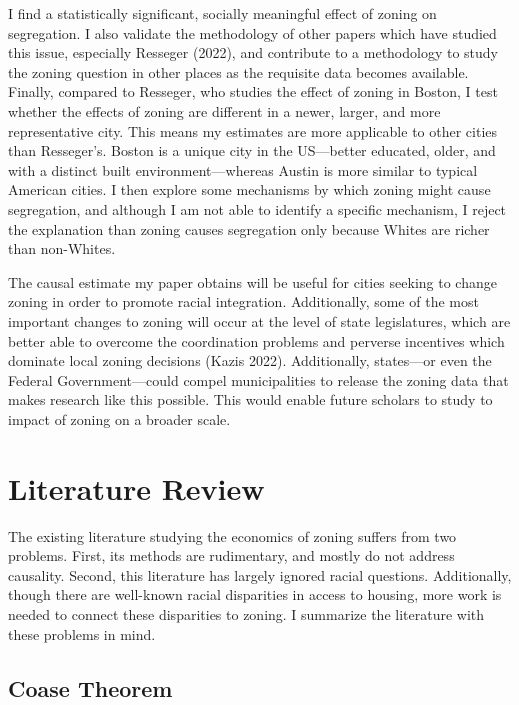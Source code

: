 \documentclass[11pt]{article}
\begin{document}
I find a statistically significant, socially meaningful effect of zoning on segregation. I also validate the methodology of other papers which have studied this issue, especially Resseger (2022), and contribute to a methodology to study the zoning question in other places as the requisite data becomes available. Finally, compared to Resseger, who studies the effect of zoning in Boston, I test whether the effects of zoning are different in a newer, larger, and more representative city. This means my estimates are more applicable to other cities than Resseger's. Boston is a unique city in the US---better educated, older, and with a distinct built environment---whereas Austin is more similar to typical American cities. I then explore some mechanisms by which zoning might cause segregation, and although I am not able to identify a specific mechanism, I reject the explanation than zoning causes segregation only because Whites are richer than non-Whites.

The causal estimate my paper obtains will be useful for cities seeking to change zoning in order to promote racial integration. Additionally, some of the most important changes to zoning will occur at the level of state legislatures, which are better able to overcome the coordination problems and perverse incentives which dominate local zoning decisions (Kazis 2022). Additionally, states---or even the Federal Government---could compel municipalities to release the zoning data that makes research like this possible. This would enable future scholars to study to impact of zoning on a broader scale.

\section{Literature Review}

The existing literature studying the economics of zoning suffers from two problems. First, its methods are rudimentary, and mostly do not address causality. Second, this literature has largely ignored racial questions. Additionally, though there are well-known racial disparities in access to housing, more work is needed to connect these disparities to zoning. I summarize the literature with these problems in mind.

\subsection{Coase Theorem}
\end{document}
